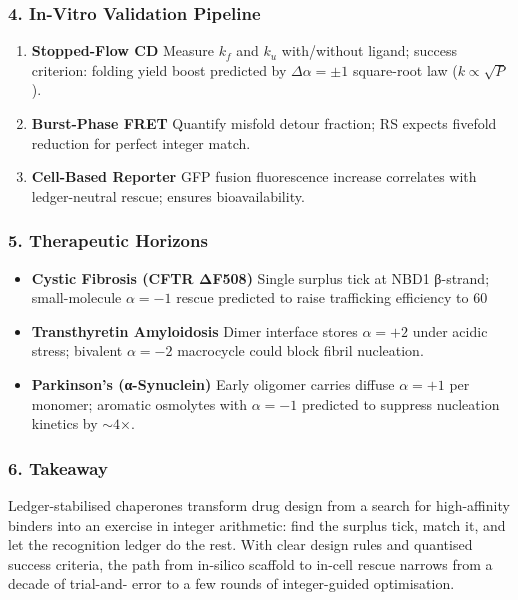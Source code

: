 \documentclass[11pt,oneside]{book}
\begin{document}
\subsubsection*{4. In-Vitro Validation Pipeline}

\begin{enumerate}[label=\textbf{\arabic*.}, leftmargin=1.2cm]
\item \textbf{Stopped-Flow CD}  
      Measure \(k_f\) and \(k_u\) with/without ligand; success criterion:
      folding yield boost predicted by \(\Delta \alpha = \pm1\) square-root
      law (\(k \propto\sqrt{P}\)).
\item \textbf{Burst-Phase FRET}  
      Quantify misfold detour fraction; RS expects fivefold reduction for
      perfect integer match.
\item \textbf{Cell-Based Reporter}  
      GFP fusion fluorescence increase correlates with ledger-neutral
      rescue; ensures bioavailability.
\end{enumerate}

\subsubsection*{5. Therapeutic Horizons}

\begin{itemize}
\item \textbf{Cystic Fibrosis (CFTR ΔF508)}  
      Single surplus tick at NBD1 β-strand; small-molecule
      \(\alpha=-1\) rescue predicted to raise trafficking efficiency to
      60 %
\item \textbf{Transthyretin Amyloidosis}  
      Dimer interface stores \(\alpha=+2\) under acidic stress; bivalent
      \(\alpha=-2\) macrocycle could block fibril nucleation.
\item \textbf{Parkinson’s (α-Synuclein)}  
      Early oligomer carries diffuse \(\alpha=+1\) per monomer; aromatic
      osmolytes with \(\alpha=-1\) predicted to suppress nucleation
      kinetics by \(\sim4\)×.
\end{itemize}

\subsubsection*{6. Takeaway}

Ledger-stabilised chaperones transform drug design from a search for
high-affinity binders into an exercise in integer arithmetic:
find the surplus tick, match it, and let the recognition ledger do the
rest.  
With clear design rules and quantised success criteria, the path from
in-silico scaffold to in-cell rescue narrows from a decade of trial-and-
error to a few rounds of integer-guided optimisation.
\end{document}

